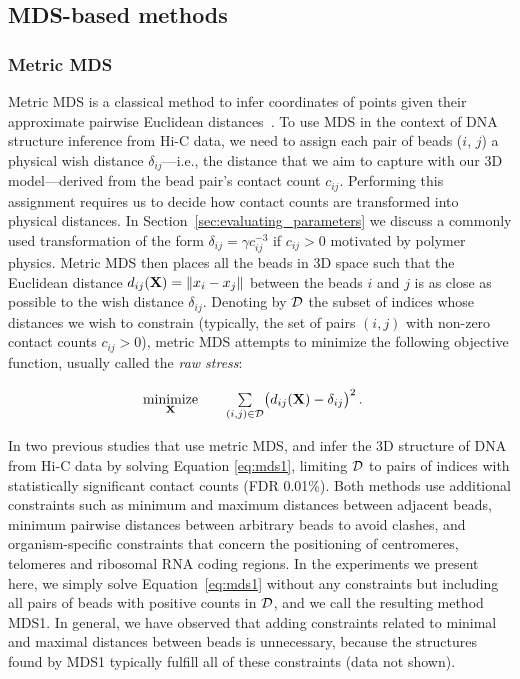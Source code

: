 \subsection{MDS-based methods}

\subsubsection{Metric MDS}

Metric MDS is a classical method to infer coordinates of points given their
approximate pairwise Euclidean distances~\citep{kruskal:multidimensional2}. To
use MDS in the context of DNA structure inference from Hi-C data, we need to
assign each pair of beads ($i$, $j$) a physical wish distance
$\delta_{ij}$---i.e., the distance that we aim to capture with our 3D
model---derived from the bead pair's contact count $c_{ij}$. Performing this
assignment requires us to decide how contact counts are transformed into physical
distances. In Section~\ref{sec:evaluating_parameters} we discuss a commonly used
transformation of the form $\delta_{ij} = \gamma
c_{ij}^{-3}$ if $c_{ij}>0$ motivated by polymer physics.
Metric MDS then places all the beads in 3D space such that
the Euclidean distance $d_{ij}(\textbf{X}) = \|x_i - x_j\|$ between the beads $i$ and
$j$ is as close as possible to the wish distance $\delta_{ij}$. Denoting by
$\mathcal{D}$ the subset of indices whose distances we wish to constrain (typically,
the set of pairs $(i,j)$ with non-zero contact counts $c_{ij}>0$), metric MDS
attempts to minimize the following objective function, usually called the \emph{raw
stress}:
\begin{equation}\label{eq:mds1}
\renewcommand{\arraystretch}{2}
\begin{array}{ccll}
\underset{\mathbf{X}}{\text{minimize}} & &
\underset{(i,j) \in \mathcal{D}}{\sum} \big(d_{ij}(\Xb) - \delta_{ij}\big)^2 \,.&\\
\end{array}
\end{equation}

In two previous studies that use metric MDS,
\citet{duan:three} and \citet{tanizawa:mapping} infer the 3D structure of DNA
from Hi-C data by solving Equation \ref{eq:mds1}, limiting $\mathcal{D}$ to pairs of
indices with statistically significant contact counts (FDR 0.01\%). Both methods use
additional constraints such as
minimum and maximum distances between adjacent beads, minimum pairwise
distances between arbitrary beads to avoid clashes, and organism-specific constraints that concern the
positioning of centromeres, telomeres and ribosomal RNA coding regions. In
the experiments we present here, we simply solve Equation~\ref{eq:mds1} without
any constraints but including all pairs of beads with positive counts in $\mathcal{D}$, and we call the
resulting method MDS1. In general, we have observed that
adding constraints related to minimal and maximal distances between beads
is unnecessary, because the structures found by MDS1 typically fulfill all of these constraints (data not shown).

